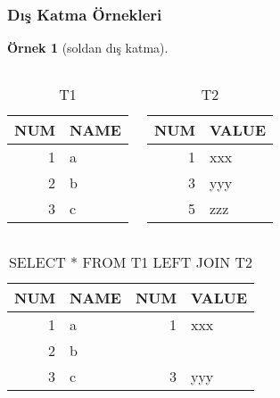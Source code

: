 \documentclass[dvipsnames]{beamer}
\theoremstyle{definition}
\theoremstyle{example}
\newtheorem{ornek}[theorem]{Örnek}
\theoremstyle{plain}
\begin{document}
\begin{frame}[fragile]
  \frametitle{Dış Katma Örnekleri}

  \begin{ornek}[soldan dış katma]
    \begin{columns}[t]
      \begin{tiny}
      \begin{table}
        \caption{T1}
        \begin{tabular}{|r|l|}\hline
NUM & NAME\\\hline\hline
  1 & a   \\\hline
  2 & b   \\\hline
  3 & c   \\\hline
        \end{tabular}
      \end{table}
      \end{tiny}

      \begin{tiny}
      \begin{table}
        \caption{T2}
        \begin{tabular}{|r|l|}\hline
NUM & VALUE\\\hline\hline
  1 & xxx  \\\hline
  3 & yyy  \\\hline
  5 & zzz  \\\hline
        \end{tabular}
      \end{table}
      \end{tiny}
    \end{columns}

    \pause
    \begin{center}
      \begin{tiny}
      \begin{table}
        \caption{SELECT * FROM T1 LEFT JOIN T2}
        \begin{tabular}{|r|l|r|l|}\hline
NUM & NAME & NUM & VALUE\\\hline\hline
  1 & a    &   1 & xxx  \\\hline
  2 & b    &     &      \\\hline
  3 & c    &   3 & yyy  \\\hline
        \end{tabular}
      \end{table}
      \end{tiny}
    \end{center}
  \end{ornek}
\end{frame}
\end{document}
